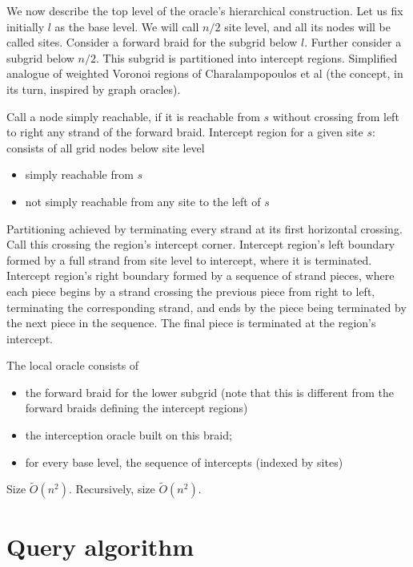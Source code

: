 \documentclass[a4paper,UKenglish,cleveref]{lipics-v2021}
\begin{document}
We now describe the top level of the oracle's hierarchical construction.
Let us fix initially $l$ as the base level.
We will call $n/2$ site level, and all its nodes will be called sites.
Consider a forward braid for the subgrid below $l$.
Further consider a subgrid below $n/2$.
This subgrid is partitioned into intercept regions.
Simplified analogue of weighted Voronoi regions of Charalampopoulos et al 
(the concept, in its turn, inspired by graph oracles).

Call a node simply reachable, if it is reachable from $s$ 
without crossing from left to right any strand of the forward braid.
Intercept region for a given site $s$: consists of all grid nodes below site level
\begin{itemize}
\item simply reachable from $s$ 
\item not simply reachable from any site to the left of $s$
\end{itemize}

Partitioning achieved by terminating every strand at its first horizontal crossing.
Call this crossing the region's intercept corner.
Intercept region's left boundary formed by a full strand from site level to intercept,
where it is terminated.
Intercept region's right boundary formed by a sequence of strand pieces,
where each piece begins by a strand crossing the previous piece from right to left,
terminating the corresponding strand,
and ends by the piece being terminated by the next piece in the sequence.
The final piece is terminated at the region's intercept.

The local oracle consists of 
\begin{itemize}
\item the forward braid for the lower subgrid 
(note that this is different from the forward braids defining the intercept regions)
\item the interception oracle built on this braid;
\item for every base level, the sequence of intercepts (indexed by sites)
\end{itemize}

Size $\tilde O(n^2)$. Recursively, size $\tilde O(n^2)$.

\section{Query algorithm}
\label{s-query}
\end{document}
